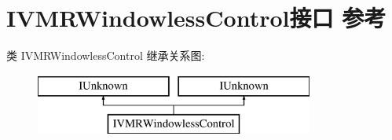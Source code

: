\hypertarget{interface_i_v_m_r_windowless_control}{}\section{I\+V\+M\+R\+Windowless\+Control接口 参考}
\label{interface_i_v_m_r_windowless_control}
类 I\+V\+M\+R\+Windowless\+Control 继承关系图\+:\begin{figure}[H]
\begin{center}
\leavevmode
\includegraphics[height=2.000000cm]{interface_i_v_m_r_windowless_control}
\end{center}
\end{figure}
